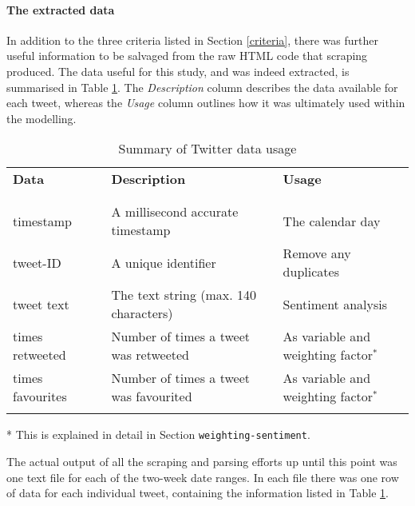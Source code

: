 \documentclass{article}
\begin{document}
\paragraph{The extracted data}
\label{sec-1-3-4-2}

In addition to the three criteria listed in Section \ref{criteria}, there was further useful information to be salvaged from the raw HTML code that scraping produced. The data useful for this study, and was indeed extracted, is summarised in Table \ref{table:twitter-data-usage}. The \emph{Description} column describes the data available for each tweet, whereas the \emph{Usage} column outlines how it was ultimately used within the modelling.

\vspace{3mm}

\begin{table}[htb]
\centering
\begin{tabular}{lllll}
\textbf{Data} &  & \textbf{Description} &  & \textbf{Usage}\\
 &  &  &  & \\
\hline
 &  &  &  & \\
timestamp &  & A millisecond accurate timestamp &  & The calendar day\\
tweet-ID &  & A unique identifier &  & Remove any duplicates\\
tweet text &  & The text string (max. 140 characters) &  & Sentiment analysis\\
times retweeted &  & Number of times a tweet was retweeted &  & As variable and weighting factor$^{\text{*}}$\\
times favourites &  & Number of times a tweet was favourited &  & As variable and weighting factor$^{\text{*}}$\\
 &  &  &  & \\
\end{tabular}\caption{\label{table:twitter-data-usage}Summary of Twitter data usage}

\end{table}

\mbox{*} This is explained in detail in Section \texttt{weighting-sentiment}. 

\vspace{5mm}

The actual output of all the scraping and parsing efforts up until this point was one text file for each of the two-week date ranges. In each file there was one row of data for each individual tweet, containing the information listed in Table \ref{table:twitter-data-usage}.
\end{document}

